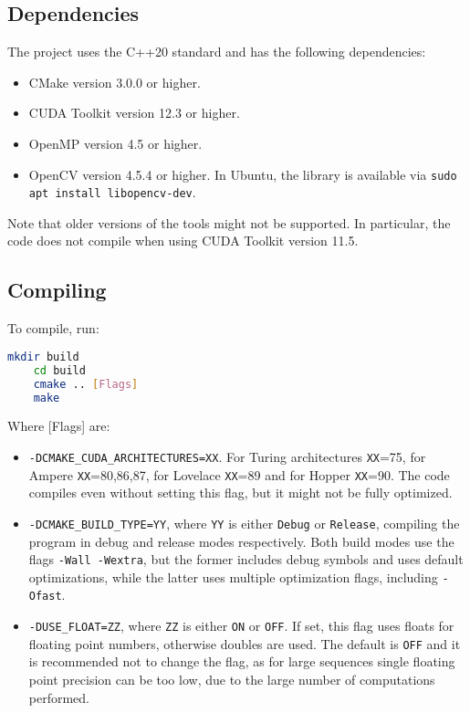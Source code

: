 \subsection{Dependencies}
The project uses the C++20 standard and has the following dependencies:
\begin{itemize}
    \item CMake version 3.0.0 or higher.
    \item CUDA Toolkit version 12.3 or higher. 
    \item OpenMP version 4.5 or higher.
    \item OpenCV version 4.5.4 or higher. In Ubuntu, the library is available via \texttt{sudo apt install libopencv-dev}.
\end{itemize}
Note that older versions of the tools might not be supported. In particular, the code does not compile when using CUDA Toolkit version 11.5.

\subsection{Compiling}
To compile, run:
\begin{lstlisting}[language=Bash]
    mkdir build
    cd build
    cmake .. [Flags]
    make
\end{lstlisting}
Where [Flags] are:
\begin{itemize}
    \item \texttt{-DCMAKE\_CUDA\_ARCHITECTURES=XX}. For Turing architectures \texttt{XX}=75, for Ampere \texttt{XX}=80,86,87, for Lovelace \texttt{XX}=89 and for Hopper \texttt{XX}=90. The code compiles even without setting this flag, but it might not be fully optimized.
    \item \texttt{-DCMAKE\_BUILD\_TYPE=YY}, where \texttt{YY} is either \texttt{Debug} or \texttt{Release}, compiling the program in debug and release modes respectively. Both build modes use the flags \texttt{-Wall -Wextra}, but the former includes debug symbols and uses default optimizations, while the latter uses multiple optimization flags, including \texttt{-Ofast}. 
    \item \texttt{-DUSE\_FLOAT=ZZ}, where \texttt{ZZ} is either \texttt{ON} or \texttt{OFF}. If set, this flag uses floats for floating point numbers, otherwise doubles are used. The default is \texttt{OFF} and it is recommended not to change the flag, as for large sequences single floating point precision can be too low, due to the large number of computations performed.
\end{itemize}

